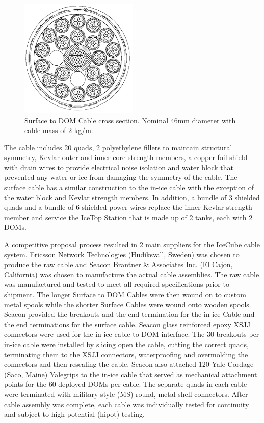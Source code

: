 \begin{figure}
  \centering
  \includegraphics[width=0.5\textwidth]{graphics/cables/cable_xsection.png}
  \caption{\label{fig:cable_xsection}Surface to DOM Cable cross
    section. Nominal 46mm diameter with cable mass of 2 kg/m.} 
\end{figure}

The cable includes 20 quads, 2 polyethylene fillers to maintain structural
symmetry, Kevlar outer and inner core strength members, a copper foil
shield with drain wires to provide electrical noise isolation and water
block that prevented any water or ice from damaging the symmetry of the
cable. The surface cable has a similar construction to the
in-ice cable with the exception of the water block and Kevlar
strength members. In addition, a bundle of 3 shielded quads and a bundle of
6 shielded power wires replace the inner Kevlar strength member and service
the IceTop Station that is made up of 2 tanks, each with 2 DOMs.

A competitive proposal process resulted in 2 main suppliers for the IceCube
cable system. Ericsson Network Technologies (Hudiksvall, Sweden) was chosen
to produce the raw cable and Seacon Brantner \& Associates Inc. (El Cajon,
California) was chosen to manufacture the actual cable assemblies. The raw
cable was manufactured and tested to meet all required specifications prior
to shipment. The longer Surface to DOM Cables were then
wound on to custom metal spools while the shorter Surface Cables were wound
onto wooden spools. Seacon provided the breakouts
and the end termination for the in-ice Cable and the end
terminations for the surface cable. Seacon glass reinforced epoxy XSJJ
connectors were used for the in-ice
cable to DOM interface. The 30 breakouts per in-ice cable were installed by
slicing open the cable, cutting the correct quads, terminating them to the
XSJJ connectors, waterproofing and overmolding the connectors and then
resealing the cable. Seacon also
attached 120 Yale Cordage (Saco, Maine) Yalegrips to the in-ice
cable that served as mechanical attachment points for the 60 deployed DOMs
per cable. The separate quads in each cable were terminated with military
style (MS) round, metal shell connectors. After cable assembly was complete,
each cable was individually tested for continuity and subject to high
potential (hipot)
testing. 

